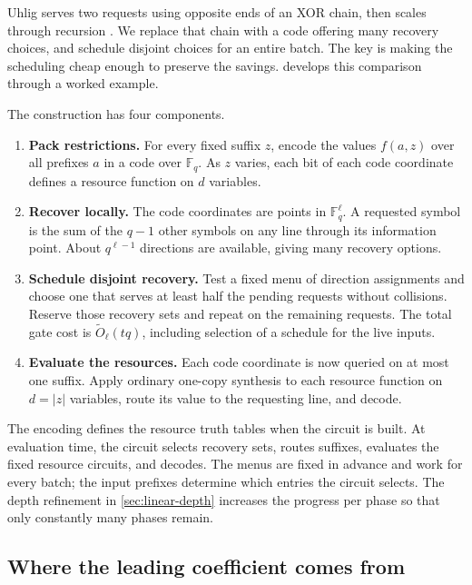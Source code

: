 \documentclass[11pt]{article}
\newcommand{\F}{\mathbb{F}}
\begin{document}
Uhlig serves two requests using opposite ends of an XOR chain, then scales
through recursion \cite{Uhlig1992,Wegener1987}.  We replace that chain with a
code offering many recovery choices, and schedule disjoint choices for an
entire batch.  The key is making the scheduling cheap enough to preserve the
savings.   develops this comparison through a worked example.

The construction has four components.
\begin{enumerate}[label=\textbf{\arabic*.},leftmargin=2.2em]
\item \textbf{Pack restrictions.}
For every fixed suffix $z$, encode the values $f(a,z)$ over all prefixes $a$
in a code over $\F_q$.  As $z$ varies, each bit of each code coordinate
defines a resource function on $d$ variables.

\item \textbf{Recover locally.}
The code coordinates are points in $\F_q^\ell$.  A requested symbol is the
sum of the $q-1$ other symbols on any line through its information point.
About $q^{\ell-1}$ directions are available, giving many recovery options.

\item \textbf{Schedule disjoint recovery.}
Test a fixed menu of direction assignments and choose one that serves at
least half the pending requests without collisions.  Reserve those recovery
sets and repeat on the remaining requests.  The total gate cost is
$\widetilde O_\ell(tq)$, including selection of a schedule for the live inputs.

\item \textbf{Evaluate the resources.}
Each code coordinate is now queried on at most one suffix.  Apply ordinary
one-copy synthesis to each resource function on $d=|z|$ variables, route its
value to the requesting line, and decode.
\end{enumerate}

The encoding defines the resource truth tables when the circuit is built.
At evaluation time, the circuit selects recovery sets, routes suffixes,
evaluates the fixed resource circuits, and decodes.  The menus are fixed in
advance and work for every batch; the input prefixes determine which entries
the circuit selects.  The depth refinement in \cref{sec:linear-depth}
increases the progress per phase so that only constantly many phases remain.

\subsection{Where the leading coefficient comes from}
\end{document}
